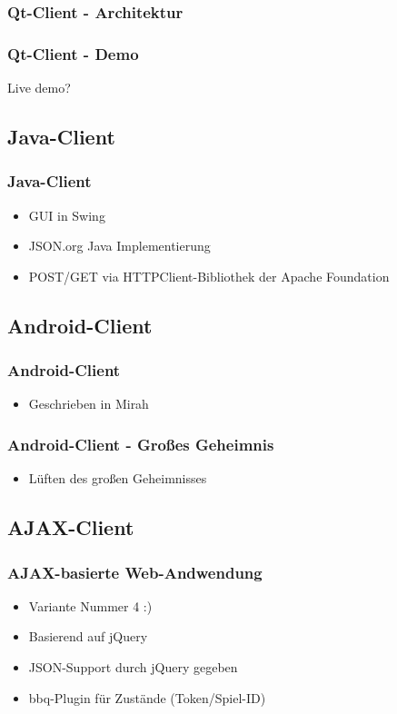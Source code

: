 \documentclass{beamer}
\begin{document}
\begin{frame}[fragile]
\frametitle{Qt-Client - Architektur}

\end{frame}

\begin{frame}[fragile]
\frametitle{Qt-Client - Demo}
Live demo?
\end{frame}

\subsection{Java-Client}
\begin{frame}[fragile]
\frametitle{Java-Client}
\begin{itemize}
\item GUI in Swing
\item JSON.org Java Implementierung
\item POST/GET via HTTPClient-Bibliothek der Apache Foundation
\end{itemize}
\end{frame}

\subsection{Android-Client}

\begin{frame}[fragile]
\frametitle{Android-Client}
\begin{itemize}
\item Geschrieben in Mirah
\end{itemize}
\end{frame}

\begin{frame}[fragile]
\frametitle{Android-Client - Großes Geheimnis}
\begin{itemize}
\item Lüften des großen Geheimnisses
\end{itemize}
\end{frame}

\subsection{AJAX-Client}

\begin{frame}[fragile]
\frametitle{AJAX-basierte Web-Andwendung}
\begin{itemize}
\item Variante Nummer 4 :)
\item Basierend auf jQuery
\item JSON-Support durch jQuery gegeben
\item bbq-Plugin für Zustände (Token/Spiel-ID)
\end{itemize}
\end{frame}
\end{document}
